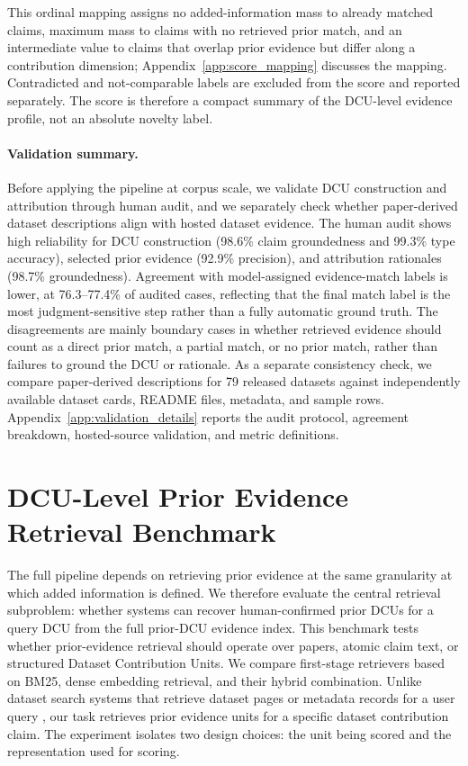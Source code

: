 \documentclass[11pt]{article}
\begin{document}
This ordinal mapping assigns no added-information mass to already matched claims, maximum mass to claims with no retrieved prior match, and an intermediate value to claims that overlap prior evidence but differ along a contribution dimension; Appendix~\ref{app:score_mapping} discusses the mapping.
Contradicted and not-comparable labels are excluded from the score and reported separately.
The score is therefore a compact summary of the DCU-level evidence profile, not an absolute novelty label.
\paragraph{Validation summary.}
Before applying the pipeline at corpus scale, we validate DCU construction and attribution through human audit, and we separately check whether paper-derived dataset descriptions align with hosted dataset evidence.
The human audit shows high reliability for DCU construction (98.6\% claim groundedness and 99.3\% type accuracy), selected prior evidence (92.9\% precision), and attribution rationales (98.7\% groundedness).
Agreement with model-assigned evidence-match labels is lower, at 76.3--77.4\% of audited cases, reflecting that the final match label is the most judgment-sensitive step rather than a fully automatic ground truth.
The disagreements are mainly boundary cases in whether retrieved evidence should count as a direct prior match, a partial match, or no prior match, rather than failures to ground the DCU or rationale.
As a separate consistency check, we compare paper-derived descriptions for 79 released datasets against independently available dataset cards, README files, metadata, and sample rows.
Appendix~\ref{app:validation_details} reports the audit protocol, agreement breakdown, hosted-source validation, and metric definitions.
\section{DCU-Level Prior Evidence Retrieval Benchmark}
\label{sec:retrieval_benchmark}

The full pipeline depends on retrieving prior evidence at the same granularity at which added information is defined.
We therefore evaluate the central retrieval subproblem: whether systems can recover human-confirmed prior DCUs for a query DCU from the full prior-DCU evidence index.
This benchmark tests whether prior-evidence retrieval should operate over papers, atomic claim text, or structured Dataset Contribution Units.
We compare first-stage retrievers based on BM25, dense embedding retrieval, and their hybrid combination.
Unlike dataset search systems that retrieve dataset pages or metadata records for a user query \citep{noy2019google,chapman2020dataset,viswanathan2023datafinder}, our task retrieves prior evidence units for a specific dataset contribution claim.
The experiment isolates two design choices: the unit being scored and the representation used for scoring.
\end{document}
